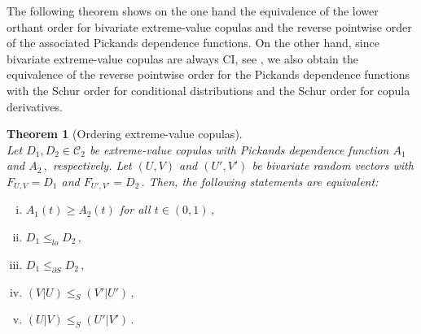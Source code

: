 \documentclass{article}
\newtheorem{theorem}{Theorem}[section]
\newcommand{\cC}{\mathcal{C}}
\begin{document}
The following theorem shows on the one hand the equivalence of the lower orthant order for bivariate extreme-value copulas and the reverse pointwise order of the associated Pickands dependence functions.
On the other hand, since bivariate extreme-value copulas are always CI, see \cite[Th\'{e}or\`{e}me 1]{Guillem-2000}, we also obtain the equivalence of the reverse pointwise order for the Pickands dependence functions with the Schur order for conditional distributions and the Schur order for copula derivatives.

\begin{theorem}[Ordering extreme-value copulas]\label{thm:ordering_ev_copulas}~\\
    Let \(D_1,D_2\in \cC_2\) be extreme-value copulas with Pickands dependence function \(A_1\) and \(A_2\,,\) respectively.
    Let \((U,V)\) and \((U',V')\) be bivariate random vectors with \(F_{U,V}=D_1\) and \(F_{U',V'}=D_2\,.\)
    Then, the following statements are equivalent:
    \begin{enumerate}[(i)]
        \item \(A_1(t)\geq A_2(t)\) for all \(t\in (0,1)\,,\)
        \item \(D_1\leq_{lo} D_2\,,\)
        \item \(D_1\leq_{\partial S} D_2\,,\)
        \item \((V|U)\leq_S (V'|U')\,,\)
        \item \((U|V)\leq_S (U'|V')\,.\)
    \end{enumerate}
\end{theorem}
\end{document}
